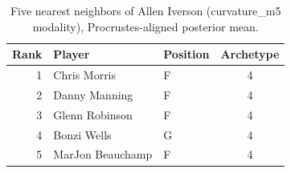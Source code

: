 \begin{table}[htbp]
  \centering\small
  \begin{tabular}{rllc}
    \toprule
    Rank & Player & Position & Archetype \\
    \midrule
    1 & Chris Morris & F & 4 \\
    2 & Danny Manning & F & 4 \\
    3 & Glenn Robinson & F & 4 \\
    4 & Bonzi Wells & G & 4 \\
    5 & MarJon Beauchamp & F & 4 \\
    \bottomrule
  \end{tabular}
  \caption{Five nearest neighbors of Allen Iverson (curvature_m5 modality), Procrustes-aligned posterior mean.}
  \label{tab:Allen_Iverson_neighbors_curvature_m5}
\end{table}

